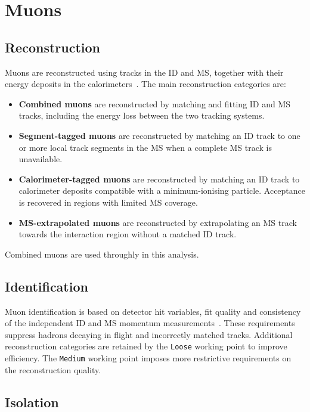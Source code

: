 \section{Muons}
\label{sec:ch6_muons}

\subsection{Reconstruction}

Muons are reconstructed using tracks in the ID and MS, together with their energy deposits in the calorimeters~\cite{ATLAS2021MuonID}.
The main reconstruction categories are:
\begin{itemize}
    \item \textbf{Combined muons} are reconstructed by matching and fitting ID and MS tracks, including the energy loss between the two tracking systems.
    \item \textbf{Segment-tagged muons} are reconstructed by matching an ID track to one or more local track segments in the MS when a complete MS track is unavailable.
    \item \textbf{Calorimeter-tagged muons} are reconstructed by matching an ID track to calorimeter deposits compatible with a minimum-ionising particle. Acceptance is recovered in regions with limited MS coverage.
    \item \textbf{MS-extrapolated muons} are reconstructed by extrapolating an MS track towards the interaction region without a matched ID track.
\end{itemize}

Combined muons are used throughly in this analysis.

\subsection{Identification}

Muon identification is based on detector hit variables, fit quality and consistency of the independent ID and MS momentum measurements~\cite{ATLAS2021MuonID}.
These requirements suppress hadrons decaying in flight and incorrectly matched tracks.
Additional reconstruction categories are retained by the \texttt{Loose} working point to improve efficiency.
The \texttt{Medium} working point imposes more restrictive requirements on the reconstruction quality.

\subsection{Isolation}

